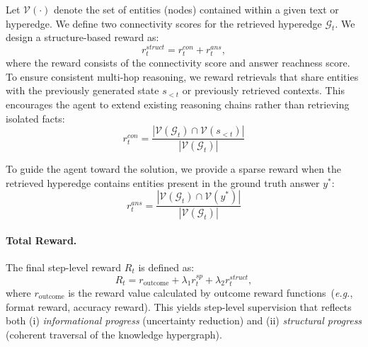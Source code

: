 Let $\mathcal{V}(\cdot)$ denote the set of entities (nodes) contained within a given text or hyperedge. We define two connectivity scores for the retrieved hyperedge $\mathcal{G}_t$.
We design a structure-based reward as:
\begin{equation}
    r_t^{struct} = r_t^{con} + r_t^{ans},
\end{equation}
where the reward consists of the connectivity score and answer reachness score.
To ensure consistent multi-hop reasoning, we reward retrievals that share entities with the previously generated state $s_{<t}$ or previously retrieved contexts.
This encourages the agent to extend existing reasoning chains rather than retrieving isolated facts:
\begin{equation}
    r_t^{con} = \frac{|\mathcal{V}(\mathcal{G}_t) \cap \mathcal{V}(s_{<t})|}{|\mathcal{V}(\mathcal{G}_t)|}
\end{equation}

To guide the agent toward the solution, we provide a sparse reward when the retrieved hyperedge contains entities present in the ground truth answer $y^*$:
\begin{equation}
    r_t^{ans} = \frac{|\mathcal{V}(\mathcal{G}_t) \cap \mathcal{V}(y^*)|}{|\mathcal{V}(\mathcal{G}_t)|}
\end{equation}

\paragraph{Total Reward.}
The final step-level reward $R_t$ is defined as:
\begin{equation}
    R_t = r_{\text{outcome}} +  \lambda_1 r_t^{sp} + \lambda_2  r_t^{struct},
\end{equation}
where $r_{\text{outcome}}$ is the reward value calculated by outcome reward functions~(\textit{e.g.}, format reward, accuracy reward).
This yields step-level supervision that reflects both (i) \emph{informational progress} (uncertainty reduction) and (ii) \emph{structural progress} (coherent traversal of the knowledge hypergraph).


